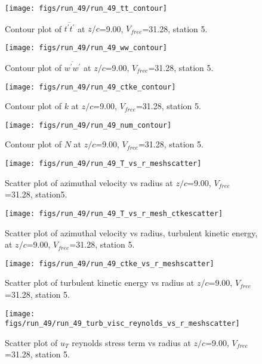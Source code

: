 \begin{figure}[H]
\centering
\texttt{[image: figs/run\_49/run\_49\_tt\_contour]}
\caption{Contour plot of $\overline{t^\prime t^\prime}$ at $z/c$=9.00, $V_{free}$=31.28, station 5.}
\end{figure}


\begin{figure}[H]
\centering
\texttt{[image: figs/run\_49/run\_49\_ww\_contour]}
\caption{Contour plot of $\overline{w^\prime w^\prime}$ at $z/c$=9.00, $V_{free}$=31.28, station 5.}
\end{figure}


\begin{figure}[H]
\centering
\texttt{[image: figs/run\_49/run\_49\_ctke\_contour]}
\caption{Contour plot of $k$ at $z/c$=9.00, $V_{free}$=31.28, station 5.}
\end{figure}


\begin{figure}[H]
\centering
\texttt{[image: figs/run\_49/run\_49\_num\_contour]}
\caption{Contour plot of $N$ at $z/c$=9.00, $V_{free}$=31.28, station 5.}
\end{figure}


\begin{figure}[H]
\centering
\texttt{[image: figs/run\_49/run\_49\_T\_vs\_r\_meshscatter]}
\caption{Scatter plot of azimuthal velocity vs radius at $z/c$=9.00, $V_{free}$=31.28, station5.}
\end{figure}


\begin{figure}[H]
\centering
\texttt{[image: figs/run\_49/run\_49\_T\_vs\_r\_mesh\_ctkescatter]}
\caption{Scatter plot of azimuthal velocity vs radius, turbulent kinetic energy, at $z/c$=9.00, $V_{free}$=31.28, station 5.}
\end{figure}


\begin{figure}[H]
\centering
\texttt{[image: figs/run\_49/run\_49\_ctke\_vs\_r\_meshscatter]}
\caption{Scatter plot of turbulent kinetic energy vs radius at $z/c$=9.00, $V_{free}$=31.28, station 5.}
\end{figure}


\begin{figure}[H]
\centering
\texttt{[image: figs/run\_49/run\_49\_turb\_visc\_reynolds\_vs\_r\_meshscatter]}
\caption{Scatter plot of $
u_T$ reynolds stress term vs radius at $z/c$=9.00, $V_{free}$=31.28, station 5.}
\end{figure}


